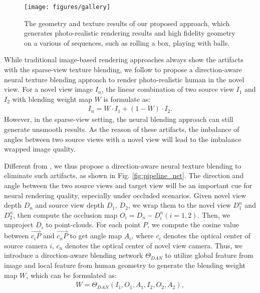 \begin{figure*}[t]
	\centering
	\texttt{[image: figures/gallery]}
	\vspace{-20pt}
	\caption{The geometry and texture results of our proposed approach, which generates photo-realistic rendering results and high fidelity geometry on a various of sequences, such as rolling a box, playing with balls.}
    \vspace{-10pt}
	\label{fig:gallery}
\end{figure*}

 \label{sec:neuralBlending}
%
While traditional image-based rendering approaches always show the artifacts with the sparse-view texture blending, we follow \cite{NeuralHumanFVV2021CVPR} to propose a direction-aware neural texture blending approach to render photo-realistic human in the novel view.
For a novel view image $I_{n}$, the linear combination of two source view $I_{1}$ and $I_{2}$ with blending weight map $W$ is formulate as:
\begin{align}
	I_{n} = W \cdot I_{1} + (1 - W) \cdot I_{2}.
\end{align}
However, in the sparse-view setting, the neural blending approach \citep{NeuralHumanFVV2021CVPR} can still generate unsmooth results. As the reason of these artifacts, the imbalance of angles between two source views with a novel view will lead to the imbalance wrapped image quality.
%

Different from \citet{NeuralHumanFVV2021CVPR}, we thus propose a direction-aware neural texture blending to eliminate such artifacts, as shown in Fig. \ref{fig:pipeline_net}.
%
The direction and angle between the two source views and target view will be an important cue for neural rendering quality, especially under occluded scenarios. 
%
Given novel view depth $D_{n}$ and source view depth $D_{1}$, $D_{2}$, we wrap them to the novel view $D_{1}^{n}$ and $D_{2}^{n}$, then compute the occlusion map $O_{i} = D_{n}- D_{i}^{n} (i=1,2)$.
%
Then, we unproject $D_{i}$ to point-clouds.
%
For each point $P$, we compute the cosine value between $\overrightarrow{c_{i}P}$ and $\overrightarrow{c_{n}P}$ to get angle map $A_{i}$, where $c_{i}$ denotes the optical center of source camera $i$, $c_{n}$ denotes the optical center of novel view camera.
%
Thus, we introduce a direction-aware blending network $\Theta_{DAN}$ to utilize global feature from image and local feature from human geometry to generate the blending weight map $W$, which can be formulated as:
\begin{align}
	W = \Theta_{DAN}(I_{1},O_{1},A_{1},I_{2},O_{2},A_{2}),
\end{align}
% 

